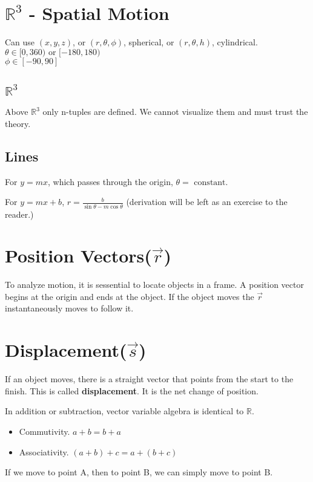 \documentclass[letterpaper]{article}
\begin{document}
\section{$\mathbb{R}^3$ - Spatial Motion}
Can use $(x, y, z)$, or $(r, \theta, \phi)$, spherical, or $(r, \theta, h)$, cylindrical.\\
$\theta \in [0, 360) \textrm{ or } [-180, 180)$\\
$\phi \in [-90, 90]$\\

\subsection{$\mathbb{R}^3$}
Above $\mathbb{R}^3$ only n-tuples are defined. We cannot visualize them and
must trust the theory. 

\subsection{Lines}

For $y = mx$, which passes through the origin, $\theta =\textrm{ constant}$.

For $y = mx + b$, $r = \frac{b}{\sin{\theta} - m\cos{\theta}}$ (derivation will
be left as an exercise to the reader.)

\section{Position Vectors($\vec{r}$)}
To analyze motion, it is sessential to locate objects in a frame. A position
vector begins at the origin and ends at the object. If the object moves
 the $\vec{r}$ instantaneously moves to follow it.

\section{Displacement($\vec{s}$)}
If an object moves, there is a straight vector that points from the start to the
finish. This is called {\bf displacement}. It is the net change of position.

In addition or subtraction, vector variable algebra is identical to $\mathbb{R}$.

\begin{itemize}
    \item Commutivity. $a + b = b + a$
    \item Associativity. $(a + b) + c = a + (b + c)$
\end{itemize}

If we move to point A, then to point B, we can simply move to point B.
\end{document}
